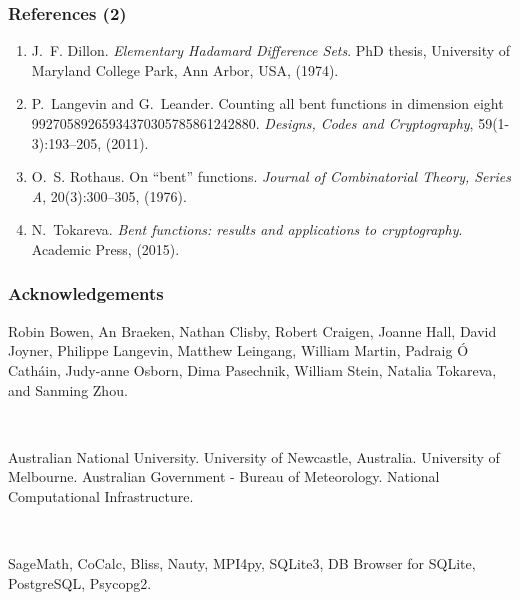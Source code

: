 \documentclass[pdf,sprung,slideColor,nocolorBG]{beamer}
\newenvironment{colortheme}[1]{
\def\ProvidesPackageRCS $##1${\relax}
\renewcommand{\ProcessOptions}{\relax}
\makeatletter

\makeatother
}{}
\begin{document}
\begin{colortheme}{jubata}
\begin{frame}
\frametitle{References (2)}
\small{}
\begin{enumerate}
\setcounter{enumi}{\value{enumisave}}
 \item
J.~F. Dillon.
{\em Elementary {Hadamard} Difference Sets}.
PhD thesis, University of Maryland College Park, Ann Arbor, USA,
  (1974).
 \item
P.~Langevin and G.~Leander.
Counting all bent functions in dimension eight
  99270589265934370305785861242880.
{\em Designs, Codes and Cryptography}, 59(1-3):193--205, (2011).
 \item
O.~S. Rothaus.
On ``bent'' functions.
{\em Journal of Combinatorial Theory, Series A}, 20(3):300--305,
  (1976).
 \item
N.~Tokareva.
{\em Bent functions: results and applications to cryptography}.
Academic Press, (2015).
\end{enumerate}

\end{frame}
\begin{frame}
\frametitle{Acknowledgements}
Robin Bowen,
An Braeken,
Nathan Clisby,
Robert Craigen,
Joanne Hall,
David Joyner,
Philippe Langevin,
Matthew Leingang,
William Martin,
Padraig {\'O} Cath{\'a}in,
Judy-anne Osborn,
Dima Pasechnik,
William Stein,
Natalia Tokareva, and
Sanming Zhou.

~

Australian National University. University of Newcastle, Australia. University of Melbourne.
Australian Government - Bureau of Meteorology.
National Computational Infrastructure.

~

SageMath, CoCalc, Bliss, Nauty, MPI4py, SQLite3, DB Browser for SQLite, PostgreSQL, Psycopg2.
\end{frame}

\end{colortheme}
\end{document}
